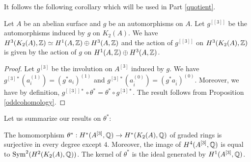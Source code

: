 It follows the following corollary which will be used in Part \ref{quotient}.
\begin{cor}\label{actionH3}
Let $A$ be an abelian surface and $g$ be an automorphisms on $A$. Let $g^{[[3]]}$ be the automorphisms induced by $g$ on $K_2(A)$.
We have $H^3(K_2(A),\Z)\simeq H^1(A,\Z)\oplus H^3(A,\Z)$ and the action of $g^{[[3]]}$ on $H^3(K_2(A),\Z)$ is given by the action of $g$ on $H^1(A,\Z)\oplus H^3(A,\Z)$.
\end{cor}
\begin{proof}
Let $g^{[3]}$ be the involution on $A^{[3]}$ induced by $g$.
We have $g^{[3]*}(a_{i}^{(1)})=(g^{*}a_{i})^{(1)}$ and $g^{[3]*}(a_{\overline{i}}^{(0)})=(g^{*}a_{\overline{i}})^{(0)}$.
Moreover, we have by definition, $g^{[[3]]*}\circ \theta^{*}=\theta^{*}\circ g^{[3]*}$.
The result follows from Proposition \ref{oddcohomology}.
\end{proof}

Let us summarize our results on $\theta^*$:
\begin{theorem}\label{thetaTheorem}
The homomorphism $\theta^* : H^*(A\hilb{3},\Q)\rightarrow H^*(\kum{A}{2},\Q)$ of graded rings is surjective in every degree except $4$. Moreover, the image of $H^4(A\hilb{3},\Q)$ is equal to $\Sym^2(H^2(\kum{A}{2},\Q))$. 
The kernel of $\theta^*$ is the ideal generated by $H^1(A\hilb{3},\Q)$.
\end{theorem}